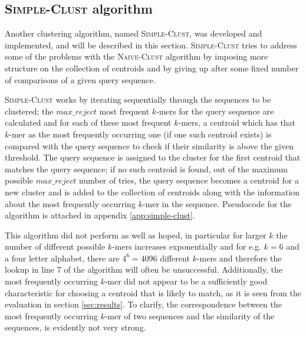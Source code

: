 


\subsection{\textsc{Simple-Clust} algorithm}

Another clustering algorithm, named \textsc{Simple-Clust}, was developed and
implemented, and will be described in this section. \textsc{Simple-Clust}
tries to address some of the problems with the \textsc{Naive-Clust} algorithm
by imposing more structure on the collection of centroids and by giving up
after some fixed number of comparisons of a given query sequence.

\textsc{Simple-Clust} works by iterating sequentially through the sequences to
be clustered; the $max\_reject$ most frequent $k$-mers for the query sequence
are calculated and for each of these most frequent $k$-mers, a centroid which
has that $k$-mer as the most frequently occurring one (if one such centroid
exists) is compared with the query sequence to check if their similarity is
above the given threshold. The query sequence is assigned to the cluster for
the first centroid that matches the query sequence; if no such centroid is
found, out of the maximum possible $max\_reject$ number of tries, the query
sequence becomes a centroid for a new cluster and is added to the collection of
centroids along with the information about the most frequently occurring
$k$-mer in the sequence. Pseudocode for the algorithm is attached in appendix
\ref{app:simple-clust}.

This algorithm did not perform as well as hoped, in particular for larger $k$
the number of different possible $k$-mers increases exponentially and for e.g.
$k = 6$ and a four letter alphabet, there are $4^6 = 4096$ different $k$-mers
and therefore the lookup in line 7 of the algorithm will often be unsuccessful.
Additionally, the most frequently occurring $k$-mer did not appear to be a
sufficiently good characteristic for choosing a centroid that is likely to
match, as it is seen from the evaluation in section \ref{sec:results}. To
clarify, the correspondence between the most frequently occurring $k$-mer of
two sequences and the similarity of the sequences, is evidently not very strong.


